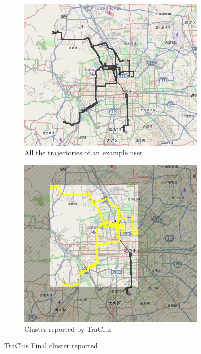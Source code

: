 \begin{itemize}
   
\begin{figure}
    \centering
    \begin{subfigure}[t]{.5\textwidth}
        \centering
        \includegraphics[scale=0.4]{figs/TrajClus_full.jpg}
        \caption{All the trajectories of an example user }
\label{fig:TrajClus_full}  
    \end{subfigure}%
	\begin{subfigure}[t]{.5\textwidth}
        \centering
        \includegraphics[scale=0.4]{figs/TrajClus_cluster.jpg}
\caption{Cluster reported by TraClus}
\label{fig:TrajClus_cluster}  
    \end{subfigure}
    \caption{TraClus Final cluster reported}
    \label{fig:traclus}       
\end{figure}



\end{itemize}
